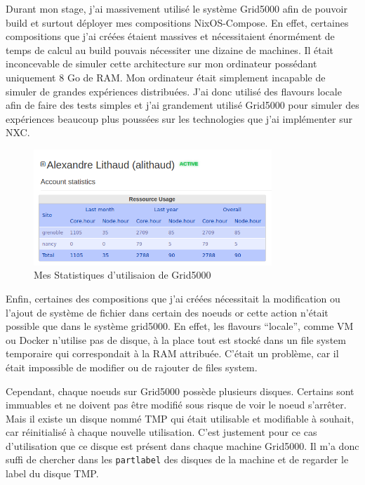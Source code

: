 \documentclass[a4paper,french,12pt, titlepage]{article}
\begin{document}
Durant mon stage, j'ai massivement utilisé le système Grid5000 afin de
pouvoir build et surtout déployer mes compositions NixOS-Compose. En
effet, certaines compositions que j'ai créées étaient massives et
nécessitaient énormément de temps de calcul au build pouvais nécessiter
une dizaine de machines. Il était inconcevable de simuler cette
architecture sur mon ordinateur possédant uniquement 8 Go de RAM. Mon
ordinateur était simplement incapable de simuler de grandes expériences
distribuées. J'ai donc utilisé des flavours locale afin de faire des
tests simples et j'ai grandement utilisé Grid5000 pour simuler des
expériences beaucoup plus poussées sur les technologies que j'ai
implémenter sur NXC.\newline

\begin{figure}[h]
\centering
\includegraphics[width=0.8\textwidth,height=0.8\textheight,keepaspectratio]{images/statg5k.png}
\caption{Mes Statistiques d'utilisaion de Grid5000}
\end{figure}

Enfin, certaines des compositions que j'ai créées nécessitait la
modification ou l'ajout de système de fichier dans certain des noeuds or
cette action n'était possible que dans le système grid5000. En effet,
les flavours ``locale'', comme VM ou Docker n'utilise pas de disque, à
la place tout est stocké dans un file system temporaire qui
correspondait à la RAM attribuée. C'était un problème, car il était
impossible de modifier ou de rajouter de files system.

Cependant, chaque noeuds sur Grid5000 possède plusieurs disques.
Certains sont immuables et ne doivent pas être modifié sous risque de
voir le noeud s'arrêter. Mais il existe un disque nommé TMP qui était
utilisable et modifiable à souhait, car réinitialisé à chaque nouvelle
utilisation. C'est justement pour ce cas d'utilisation que ce disque est
présent dans chaque machine Grid5000. Il m'a donc suffi de chercher dans
les \texttt{partlabel} des disques de la machine et de regarder le label
du disque TMP.\newline
\end{document}
